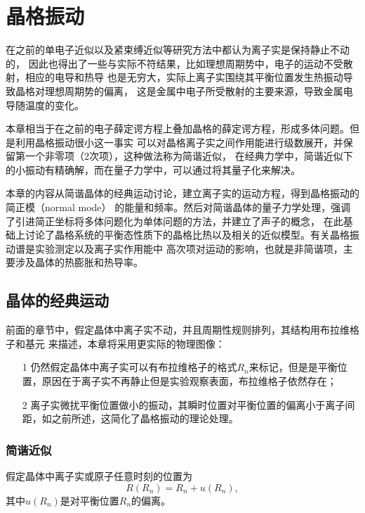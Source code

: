 \chapter{晶格振动}
    在之前的单电子近似以及紧束缚近似等研究方法中都认为离子实是保持静止不动的，
    因此也得出了一些与实际不符结果，比如理想周期势中，电子的运动不受散射，相应的电导和热导
    也是无穷大，实际上离子实围绕其平衡位置发生热振动导致晶格对理想周期势的偏离，
    这是金属中电子所受散射的主要来源，导致金属电导随温度的变化。

    本章相当于在之前的电子薛定谔方程上叠加晶格的薛定谔方程，形成多体问题。但是利用晶格振动很小这一事实
    可以对晶格离子实之间作用能进行级数展开，并保留第一个非零项（2次项），这种做法称为简谐近似，
    在经典力学中，简谐近似下的小振动有精确解，而在量子力学中，可以通过将其量子化来解决。

    本章的内容从简谐晶体的经典运动讨论，建立离子实的运动方程，得到晶格振动的简正模（normal mode）
    的能量和频率。然后对简谐晶体的量子力学处理，强调了引进简正坐标将多体问题化为单体问题的方法，并建立了声子的概念，
    在此基础上讨论了晶格系统的平衡态性质下的晶格比热以及相关的近似模型。有关晶格振动谱是实验测定以及离子实作用能中
    高次项对运动的影响，也就是非简谐项，主要涉及晶体的热膨胀和热导率。

    \section{晶体的经典运动}
        前面的章节中，假定晶体中离子实不动，并且周期性规则排列，其结构用布拉维格子和基元
        来描述，本章将采用更实际的物理图像：
        \begin{itemize}
            \item[1] 仍然假定晶体中离子实可以有布拉维格子的格式$R_n$来标记，但是是平衡位置，原因在于离子实不再静止但是实验观察表面，布拉维格子依然存在；
            \item[2] 离子实微扰平衡位置做小的振动，其瞬时位置对平衡位置的偏离小于离子间距，如之前所述，这简化了晶格振动的理论处理。
        \end{itemize}
        \subsection{简谐近似}
            假定晶体中离子实或原子任意时刻的位置为
            \begin{equation}
                R(R_n)=R_n+u(R_n),
            \end{equation}
            其中$u(R_n)$是对平衡位置$R_n$的偏离。

